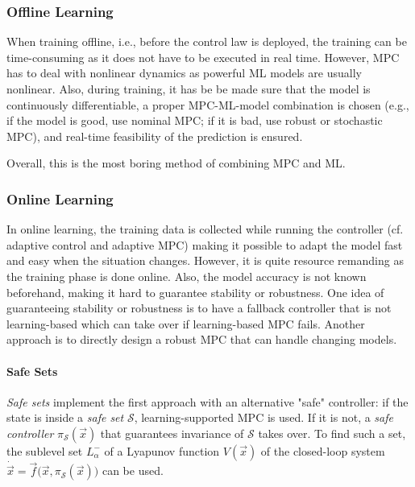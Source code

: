 			\subsubsection{Offline Learning}
				When training offline, i.e., before the control law is deployed, the training can be time-consuming as it does not have to be executed in real time. However, MPC has to deal with nonlinear dynamics as powerful ML models are usually nonlinear. Also, during training, it has be be made sure that the model is continuously differentiable, a proper MPC-ML-model combination is chosen (e.g., if the model is good, use nominal MPC; if it is bad, use robust or stochastic MPC), and real-time feasibility of the prediction is ensured.

				Overall, this is the most boring method of combining MPC and ML.

			\subsubsection{Online Learning}
				In online learning, the training data is collected while running the controller (cf. adaptive control and adaptive MPC) making it possible to adapt the model fast and easy when the situation changes. However, it is quite resource remanding as the training phase is done online. Also, the model accuracy is not known beforehand, making it hard to guarantee stability or robustness. One idea of guaranteeing stability or robustness is to have a fallback controller that is not learning-based which can take over if learning-based MPC fails. Another approach is to directly design a robust MPC that can handle changing models.

				\paragraph{Safe Sets}
					\emph{Safe sets} implement the first approach with an alternative "safe" controller: if the state is inside a \emph{safe set} \(\mathcal{S}\), learning-supported MPC is used. If it is not, a \emph{safe controller} \( \pi_\mathcal{S}(\vec{x}) \) that guarantees invariance of \(\mathcal{S}\) takes over. To find such a set, the sublevel set \( L_\alpha^- \) of a Lyapunov function \(V(\vec{x})\) of the closed-loop system \( \dot{\vec{x}} = \vec{f}\bigl( \vec{x}, \pi_\mathcal{S}(\vec{x}) \bigr) \) can be used.

